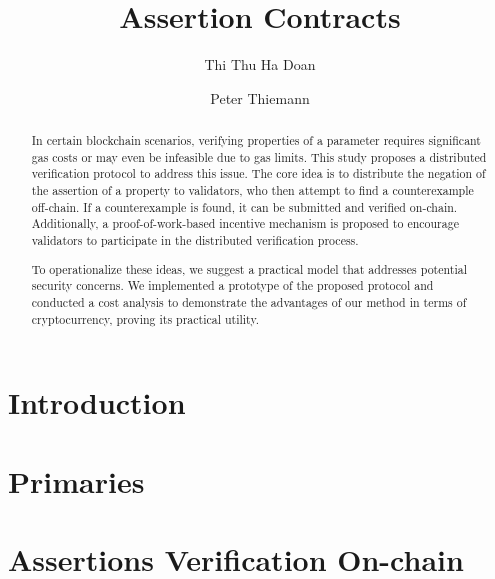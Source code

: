 \documentclass[runningheads]{llncs}
\begin{document}
%
\title{Assertion Contracts}
%
%
\author{Thi Thu Ha Doan\and Peter Thiemann}

%
%
%
\maketitle              %
%
\begin{abstract}
In certain blockchain scenarios, verifying properties of a parameter requires significant gas costs or may even be infeasible due to gas limits. This study proposes a distributed verification protocol to address this issue. The core idea is to distribute the negation of the assertion of a property to validators, who then attempt to find a counterexample off-chain. If a counterexample is found, it can be submitted and verified on-chain. Additionally, a proof-of-work-based incentive mechanism is proposed to encourage validators to participate in the distributed verification process.

To operationalize these ideas, we suggest a practical model that addresses potential security concerns. We  implemented a prototype of the proposed protocol and conducted a cost analysis to demonstrate the advantages of our method in terms of cryptocurrency, proving its practical utility.
 \keywords{}
\end{abstract}
%
%
%
\section{Introduction}
\label{sec:introduction}

\section{Primaries}
\label{sec:primaries}


\section{Assertions Verification On-chain}
\label{sec:assertion-verification-onchain}
\end{document}

